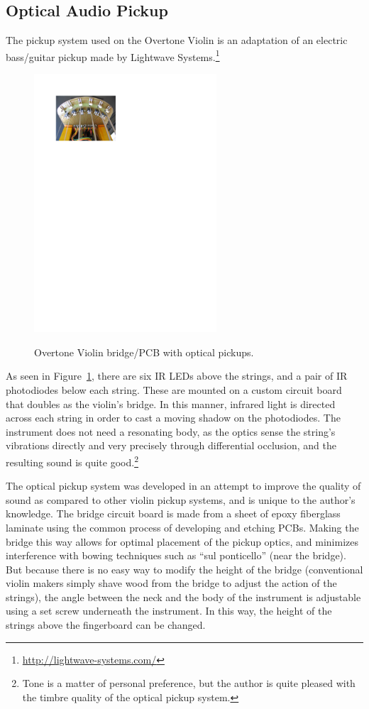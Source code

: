 \subsection{Optical Audio Pickup}

The pickup system used on the Overtone Violin is an adaptation of an electric
bass/guitar pickup made by Lightwave Systems.\footnote{\url{http://lightwave-systems.com/}}

\begin{figure}[t]
\centering
\includegraphics[width=193pt]{img-2-eps-converted-to.pdf}\textbf{ }
\caption{Overtone Violin bridge/PCB with optical pickups.}
\label{Overholt:fig:2} 
\end{figure}

As seen in Figure~\ref{Overholt:fig:2}, there are six IR LEDs above the strings, and a pair of IR
photodiodes below each string. These are mounted on a custom circuit board that
doubles as the violin's bridge. In this manner, infrared light is directed across
each string in order to cast a moving shadow on the photodiodes. The instrument
does not need a resonating body, as the optics sense the string's vibrations
directly and very precisely through differential occlusion, and the resulting
sound is quite good.\footnote{Tone is a matter of personal preference, but the
author is quite pleased with the timbre quality of the optical pickup system.}

The optical pickup system was developed in an attempt to improve the quality of
sound as compared to other violin pickup systems, and is unique to the author's
knowledge. The bridge circuit board is made from a sheet of epoxy fiberglass
laminate using the common process of developing and etching PCBs. Making the
bridge this way allows for optimal placement of the pickup optics, and minimizes
interference with bowing techniques such as ``sul ponticello'' (near the bridge).
But because there is no easy way to modify the height of the bridge (conventional
violin makers simply shave wood from the bridge to adjust the action of the
strings), the angle between the neck and the body of the instrument is adjustable
using a set screw underneath the instrument. In this way, the height of the
strings above the fingerboard can be changed.

